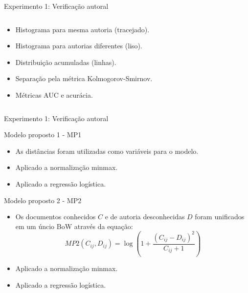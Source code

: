 \begin{frame}{Experimento 1: Verificação autoral}
\begin{columns}
\begin{column}{0.37\textwidth}
\begin{itemize}
	\item Histograma para mesma autoria (tracejado).
	\item Histograma para autorias diferentes (liso).
	\item Distribuição acumuladas (linhas).
	\item Separação pela métrica Kolmogorov-Smirnov.
	\item Métricas AUC e acurácia.
\end{itemize}
\end{column}
\end{columns}


\end{frame}
\begin{frame}{Experimento 1: Verificação autoral}
\begin{block}{Modelo proposto 1 - MP1}
\begin{itemize}
\item As distâncias foram utilizadas como variáveis para o modelo.
\item Aplicado a normalização minmax.
\item Aplicado a regressão logística.
\end{itemize}
\end{block}
\begin{block}{Modelo proposto 2 - MP2}
\begin{itemize}
\item Os documentos conhecidos $C$ e de autoria desconhecidas $D$ foram unificados em um úncio BoW através da equação:
\begin{equation}
MP2\left ( C_{ij}, D_{ij} \right ) = \log\left ( 1 + \frac{\left ( C_{ij}-D_{ij} \right )^2}{C_{ij}+1} \right )
\label{eq:verificacao.mp2}
\end{equation}
\item Aplicado a normalização minmax.
\item Aplicado a regressão logística.
\end{itemize}		
\end{block}	
\end{frame}


